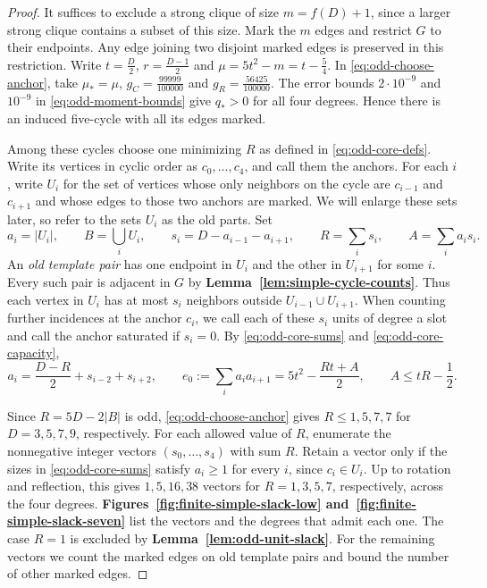 \documentclass[preprint,11pt,numbers]{elsarticle-arxiv}
\numberwithin{equation}{section}
\theoremstyle{definition}
\begin{document}
\begin{proof}
It suffices to exclude a strong clique of size $m=f(D)+1$,
since a larger strong clique contains a subset of this size.
Mark the $m$ edges and restrict $G$ to their endpoints. Any
edge joining two disjoint marked edges is preserved in this
restriction. Write $t=\frac{D}{2}$, $r=\frac{D-1}{2}$ and
$\mu=5t^2-m=t-\frac{5}{4}$. In \eqref{eq:odd-choose-anchor},
take $\mu_*=\mu$, $g_C=\frac{99999}{100000}$ and
$g_R=\frac{56425}{100000}$. The error bounds
$2\cdot10^{-9}$ and $10^{-9}$ in \eqref{eq:odd-moment-bounds}
give $q_*>0$ for all four degrees. Hence there is an induced
five-cycle with all its edges marked.

Among these cycles choose one minimizing $R$ as defined in
\eqref{eq:odd-core-defs}. Write its vertices in cyclic order as
$c_0,\ldots,c_4$, and call them the anchors. For each $i$, write
$U_i$ for the set of vertices whose only neighbors on the cycle
are $c_{i-1}$ and $c_{i+1}$ and whose edges to those two anchors
are marked. We will enlarge these sets later, so refer to the
sets $U_i$ as the old parts. Set
\[
 a_i=|U_i|,\qquad B=\bigcup_i U_i,\qquad
 s_i=D-a_{i-1}-a_{i+1},\qquad R=\sum_i s_i,\qquad A=\sum_i a_i s_i.
\]
An \emph{old template pair} has one endpoint in $U_i$ and the other
in $U_{i+1}$ for some $i$. Every such pair is adjacent in $G$ by
\textbf{Lemma~\ref{lem:simple-cycle-counts}}. Thus each vertex in
$U_i$ has at most $s_i$ neighbors outside $U_{i-1}\cup U_{i+1}$.
When counting further incidences at the anchor $c_i$, we call
each of these $s_i$ units of degree a slot and call the anchor
saturated if $s_i=0$. By \eqref{eq:odd-core-sums}
and \eqref{eq:odd-core-capacity},
\[
 a_i=\frac{D-R}{2}+s_{i-2}+s_{i+2},\qquad
 e_0:=\sum_i a_i a_{i+1}=5t^2-\frac{Rt+A}{2},\qquad
 A\leq tR-\frac{1}{2}.
\]

Since $R=5D-2|B|$ is odd, \eqref{eq:odd-choose-anchor} gives
$R\leq1,5,7,7$ for $D=3,5,7,9$, respectively. For each allowed
value of $R$, enumerate the nonnegative integer vectors
$(s_0,\ldots,s_4)$ with sum $R$. Retain a vector only if the
sizes in \eqref{eq:odd-core-sums} satisfy $a_i\geq1$ for
every $i$, since $c_i\in U_i$. Up to rotation and reflection,
this gives $1,5,16,38$ vectors for $R=1,3,5,7$, respectively,
across the four degrees.
\textbf{Figures~\ref{fig:finite-simple-slack-low}
and~\ref{fig:finite-simple-slack-seven}} list the vectors and the degrees
that admit each one. The case $R=1$ is excluded by
\textbf{Lemma~\ref{lem:odd-unit-slack}}. For the remaining vectors we
count the marked edges on old template pairs and bound the number
of other marked edges.


\end{proof}
\end{document}
